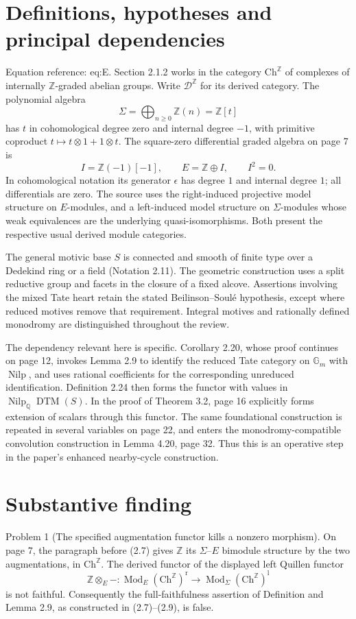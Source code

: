 \documentclass[10pt]{article}
\begin{document}
\section*{Definitions, hypotheses and principal dependencies}
Equation reference: eq:E. Section 2.1.2 works in the category \(\mathrm{Ch}^{\mathbb Z}\) of complexes of internally \(\mathbb Z\)-graded abelian groups. Write \(\mathcal D^\mathbb Z\) for its derived category. The polynomial algebra \[\Sigma=\bigoplus_{n\geq0}\mathbb Z(n)=\mathbb Z[t]\] has \(t\) in cohomological degree zero and internal degree \(-1\), with primitive coproduct \(t\mapsto t\otimes1+1\otimes t\). The square-zero differential graded algebra on page 7 is \[
 I=\mathbb Z(-1)[-1],\qquad E=\mathbb Z\oplus I,\qquad I^2=0.\] In cohomological notation its generator \(\epsilon\) has degree \(1\) and internal degree \(1\); all differentials are zero. The source uses the right-induced projective model structure on \(E\)-modules, and a left-induced model structure on \(\Sigma\)-modules whose weak equivalences are the underlying quasi-isomorphisms. Both present the respective usual derived module categories.\par
The general motivic base \(S\) is connected and smooth of finite type over a Dedekind ring or a field (Notation 2.11). The geometric construction uses a split reductive group and facets in the closure of a fixed alcove. Assertions involving the mixed Tate heart retain the stated Beilinson–Soulé hypothesis, except where reduced motives remove that requirement. Integral motives and rationally defined monodromy are distinguished throughout the review.\par
The dependency relevant here is specific. Corollary 2.20, whose proof continues on page 12, invokes Lemma 2.9 to identify the reduced Tate category on \(\mathbb G_m\) with \(\operatorname{Nilp}\), and uses rational coefficients for the corresponding unreduced identification. Definition 2.24 then forms the functor with values in \(\operatorname{Nilp}_{\mathbb Q}\operatorname{DTM}(S)\). In the proof of Theorem 3.2, page 16 explicitly forms extension of scalars through this functor. The same foundational construction is repeated in several variables on page 22, and enters the monodromy-compatible convolution construction in Lemma 4.20, page 32. Thus this is an operative step in the paper’s enhanced nearby-cycle construction.\par
\section*{Substantive finding}
Problem 1 (The specified augmentation functor kills a nonzero morphism).  On page 7, the paragraph before (2.7) gives \(\mathbb Z\) its \(\Sigma\)–\(E\) bimodule structure by the two augmentations, in \(\mathrm{Ch}^{\mathbb Z}\). The derived functor of the displayed left Quillen functor \[\mathbb Z\otimes_E-:\operatorname{Mod}_E(\mathrm{Ch}^{\mathbb Z})^{\mathrm r}
       \longrightarrow\operatorname{Mod}_\Sigma(\mathrm{Ch}^{\mathbb Z})^{\mathrm l}\] is not faithful. Consequently the full-faithfulness assertion of Definition and Lemma 2.9, as constructed in (2.7)–(2.9), is false.\par
\end{document}

